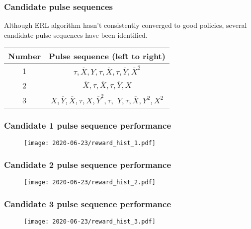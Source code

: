 \documentclass{beamer}
\begin{document}
\begin{frame}
\frametitle{Candidate pulse sequences}

Although ERL algorithm hasn't consistently converged to good policies, several candidate pulse sequences have been identified.

\begin{table}
    \label{tab:candidates}
    \begin{tabular}{c c}
        Number & Pulse sequence (left to right) \\
        \hline
        1 & $\tau, \overline{X}, Y, \tau, \overline{X}, \tau, \overline{Y}, \overline{X}^2$ \\
        2 & $\overline{X}, \tau, \overline{X}, \tau, \overline{Y}, X$ \\
        3 & $X, \overline{Y}, \overline{X}, \tau, X, \overline{Y}^2, \tau, $
            $Y, \tau, \overline{X}, Y^2, X^2$ \\
    \end{tabular}
\end{table}


\end{frame}

\begin{frame}
\frametitle{Candidate 1 pulse sequence performance}

\begin{figure}
    \centering
    \texttt{[image: 2020-06-23/reward\_hist\_1.pdf]}
    \label{fig:candidate_1}
\end{figure}

\end{frame}

\begin{frame}
\frametitle{Candidate 2 pulse sequence performance}

\begin{figure}
    \centering
    \texttt{[image: 2020-06-23/reward\_hist\_2.pdf]}
    \label{fig:candidate_2}
\end{figure}


\end{frame}

\begin{frame}
\frametitle{Candidate 3 pulse sequence performance}

\begin{figure}
    \centering
    \texttt{[image: 2020-06-23/reward\_hist\_3.pdf]}
    \label{fig:candidate_3}
\end{figure}

\end{frame}
\end{document}
